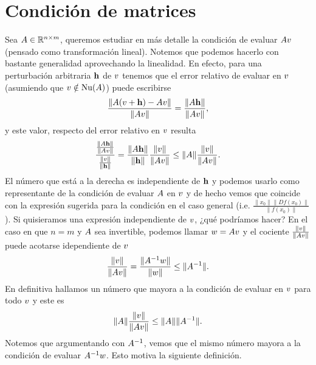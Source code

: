 \section{Condición de matrices}
Sea $\Ab\in \R^{n\times m}$,  queremos estudiar en más detalle la condición de evaluar $\Ab\vb$ (pensado como transformación lineal). Notemos que podemos hacerlo con bastante generalidad aprovechando la linealidad.
En efecto, para una perturbación arbitraria $\mathbf{h}$ de $\vb$ tenemos que el error relativo de evaluar en $\vb$ (asumiendo que $\vb\notin \Nu(\Ab)$) puede escribirse
$$
\frac{\|\Ab(\vb+\hb)-\Ab\vb \|}{\|\Ab\vb\|}=\frac{\|\Ab\hb\|}{\|\Ab\vb\|},
$$
y este valor, respecto del error relativo en $\vb$ resulta
$$
\frac{\frac{\|\Ab\hb\|}{\|\Ab\vb\|}}{\frac{\|\vb\|}{\|\hb\|}}=\frac{\|\Ab\hb\|}{\|\hb\|}\frac{\|\vb\|}{\|\Ab\vb\|}\le \|\Ab\|\frac{\|\vb\|}{\|\Ab\vb\|}.
$$
El número que está a la derecha es independiente de $\mathbf{h}$ y podemos usarlo como representante de la condición de evaluar $\Ab$ en $\vb$ y de hecho vemos que  coincide con la expresión sugerida para la condición en el caso general  (i.e. $
\frac{\|x_0\|\|Df(x_0)\|}{\|f(x_0)\|}
$). Si quisieramos una expresión independiente de $\vb$, ¿qué podríamos hacer? En el caso en que $n=m$ y $\Ab$ sea invertible, podemos llamar $\wb=\Ab\vb$ y el cociente $\frac{\|\vb\|}{\|\Ab\vb\|}$ puede acotarse idependiente de $\vb$
$$
\frac{\|\vb\|}{\|\Ab\vb\|}=
\frac{\|\Ab^{-1}\wb\|}{\|\wb\|}
\le \|\Ab^{-1}\|.$$
En definitiva hallamos un número que mayora a la condición de evaluar en $\vb$ para todo $\vb$ y este es
$$
\|\Ab\|\frac{\|\vb\|}{\|\Ab\vb\|}\le \|\Ab\|\|\Ab^{-1}\|.
$$
Notemos que argumentando con $\Ab^{-1}$, vemos que el mismo número mayora a la condición de evaluar $\Ab^{-1}\wb$. Esto motiva la siguiente definición.

